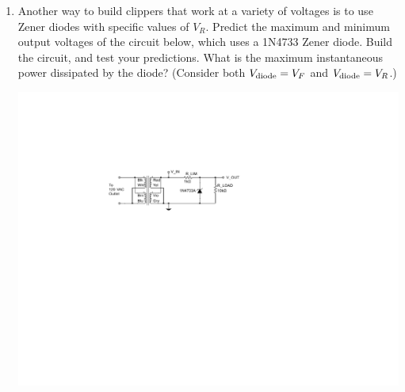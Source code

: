 \begin{enumerate}[wide]
\item Another way to build clippers that work at a variety of voltages is to use Zener diodes with specific values of $V_R$.  Predict the maximum and minimum output voltages of the circuit below, which uses a 1N4733 Zener diode.  Build the circuit, and test your predictions.  What is the maximum instantaneous power dissipated by the diode?  (Consider both $V_{\rm diode}=V_F$ and $V_{\rm diode}=V_R$.)  \label{part_zener_shunt_clipper}
\begin{center}
\includegraphics{diodes/zener_shunt_clipper.pdf}
\end{center} 
 

\end{enumerate}
